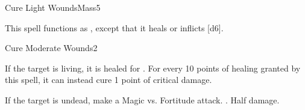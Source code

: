 \begin{spellsection}{Cure Light Wounds}{Mass}{5}
\begin{spellheader}
\end{spellheader}
\begin{spellcontent}
    \begin{spelltargetinginfo}
    \end{spelltargetinginfo}
    \begin{spelleffects}
        \spellspecial This spell functions as , except that it heals or inflicts [d6].
    \end{spelleffects}
\end{spellcontent}
\begin{spellfooter}
\end{spellfooter}
\end{spellsection}

\begin{spellsection}{Cure Moderate Wounds}{2}
\begin{spellheader}
\end{spellheader}
\begin{spellcontent}
    \begin{spelltargetinginfo}
    \end{spelltargetinginfo}
    \begin{spelleffects}
        \spelleffect If the target is living, it is healed for . For every 10 points of healing granted by this spell, it can instead cure 1 point of critical damage.
        \begin{spellattacktriggered}{If the target is undead, make a Magic vs. Fortitude attack.}
            \spellsuccess {}.
            \spellfailure Half damage.
        \end{spellattacktriggered}
    \end{spelleffects}
\end{spellcontent}
\begin{spellfooter}
\end{spellfooter}
\end{spellsection}

